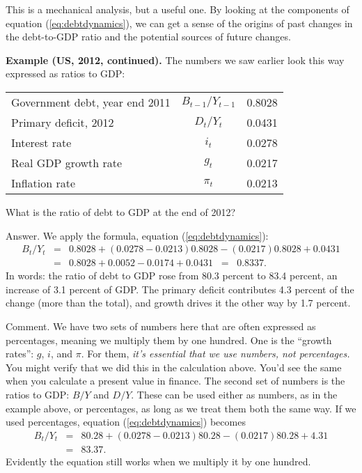 This is a mechanical analysis, but a useful one.
By looking at the components of equation (\ref{eq:debtdynamics}),
we can get a sense of the origins of past changes in the debt-to-GDP ratio
and the potential sources of future changes.


{\bf Example (US, 2012, continued).}
The numbers we saw earlier look this way expressed as ratios to GDP:

\begin{center}
\begin{tabular}{lcr}
\toprule
%
Government debt, year end 2011  &  $B_{t-1}/Y_{t-1}$ & 0.8028 \\
Primary deficit, 2012           &  $D_t/Y_t$         & 0.0431 \\
Interest rate                   &  $i_t$             & 0.0278 \\
Real GDP growth rate            &  $g_t$             & 0.0217 \\
Inflation rate                  &  $\pi_t$           & 0.0213 \\
\bottomrule
\end{tabular}
\end{center}

What is the ratio of debt to GDP at the end of 2012?

Answer.  We apply the formula, equation (\ref{eq:debtdynamics}):
\begin{eqnarray*}
    {B_{t}}/{Y_{t}} &=&  0.8028  + (0.0278-0.0213)0.8028 - (0.0217) 0.8028 + 0.0431 \\
            &=&  0.8028 + 0.0052 - 0.0174 + 0.0431 \;\;=\;\; 0.8337.
\end{eqnarray*}
In words:  the ratio of debt to GDP rose from 80.3 percent to 83.4 percent,
an increase of 3.1 percent of GDP.
The primary deficit contributes 4.3 percent of the change (more than the total),
and growth drives it the other way by 1.7 percent.

Comment.  We have two sets of numbers here that are often expressed 
as percentages, meaning we multiply them by one hundred.
One is the ``growth rates'':  $g$, $i$, and $\pi$.  
For them, {\it it's essential that we use numbers, not percentages.\/}
You might verify that we did this in the calculation above.  
You'd see the same when you calculate a present value in finance.  
The second set of numbers is the ratios to GDP:  $B/Y$ and $D/Y$.  
These can be used either as numbers, as in the example above, or percentages, 
as long as we treat them both the same way.  
If we used percentages, equation (\ref{eq:debtdynamics}) 
becomes 
\begin{eqnarray*}
    {B_{t}}/{Y_{t}} &=&  80.28  + (0.0278-0.0213) 80.28 - (0.0217) 80.28 + 4.31 \\
            &=&  83.37.
\end{eqnarray*}
Evidently the equation still works when we multiply it by one hundred.  



